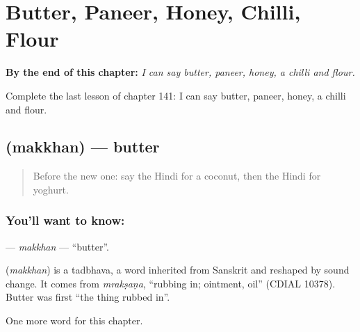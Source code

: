 
\chapter{Butter, Paneer, Honey, Chilli, Flour}
\label{ch:hi-butter-paneer-honey-chilli-flour}

\begin{chapteropening}
\textbf{By the end of this chapter:} \emph{I can say butter, paneer, honey, a chilli and flour.}

Complete the last lesson of chapter 141: I can say butter, paneer, honey, a chilli and flour.
\end{chapteropening}

\section[\texorpdfstring{\hi{मक्खन} (makkhan)}{मक्खन (makkhan)}]{ (makkhan) — butter}

\label{lesson:HI-C141-makkhan}



\begin{quote}
Before the new one: say the Hindi for a coconut, then the Hindi for yoghurt.
\end{quote}

\subsection*{You'll want to know: }
\textbf{} — \emph{makkhan} — \textquotedblleft{}butter\textquotedblright{}.

\begin{cousinweb}
\textbf{} (\emph{makkhan}) is a tadbhava, a word inherited from Sanskrit and reshaped by sound change. It comes from \emph{mrakṣaṇa}, \textquotedblleft{}rubbing in; ointment, oil\textquotedblright{} (CDIAL 10378). Butter was first \textquotedblleft{}the thing rubbed in\textquotedblright{}.
\end{cousinweb}

\begin{grammarlens}[title={What you've built}]
One more word for this chapter.
\end{grammarlens}

